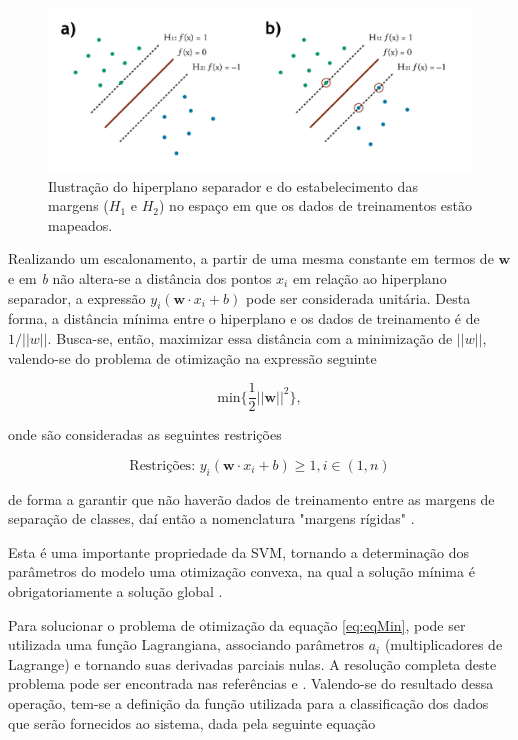 \begin{figure}[H]
 \centering
  \includegraphics[width=0.9\linewidth]{figuras/marginSVM.pdf}
  \caption{Ilustração do hiperplano separador e do estabelecimento das margens ($H_1$ e $H_2$) no espaço em que os dados de treinamentos estão mapeados.}
  \label{fig:marginSVM}
\end{figure}

Realizando um escalonamento, a partir de uma mesma constante em termos de $\boldsymbol{w}$ e em \textit{b} não altera-se a distância dos pontos $x_i$ em relação ao hiperplano separador, a expressão $y_i(\boldsymbol{w} \cdot x_i + b)$ pode ser considerada unitária. Desta forma, a distância mínima entre o hiperplano e os dados de treinamento é de $1/||w||$. Busca-se, então, maximizar essa distância com a minimização de $||w||$, valendo-se do problema de otimização na expressão seguinte

\begin{equation}
\label{eq:eqMin}
  \text{min}\{\frac{1}{2}||\boldsymbol{w}||^2\},
\end{equation}

onde são consideradas as seguintes restrições

\begin{equation}
\label{eq:eqRestrição}
  \text{Restrições: } y_i(\boldsymbol{w} \cdot x_i + b) \geq 1, i \in (1,n)
\end{equation}

de forma a garantir que não haverão dados de treinamento entre as margens de separação de classes, daí então a nomenclatura "margens rígidas" .

Esta é uma importante propriedade da SVM, tornando a determinação dos parâmetros do modelo uma otimização convexa, na qual a solução mínima é obrigatoriamente a solução global .

Para solucionar o problema de otimização da equação \ref{eq:eqMin}, pode ser utilizada uma função Lagrangiana, associando parâmetros $a_i$ (multiplicadores de Lagrange) e tornando suas derivadas parciais nulas. A resolução completa deste problema pode ser encontrada nas referências  e . Valendo-se do resultado dessa operação, tem-se a definição da função utilizada para a classificação dos dados que serão fornecidos ao sistema, dada pela seguinte equação

